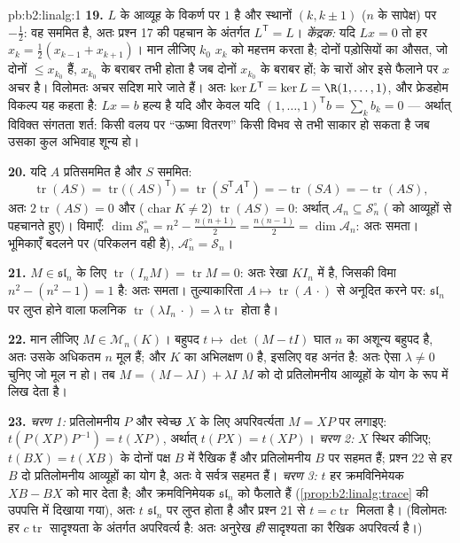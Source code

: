 \begin{solution}{pb:b2:linalg:1}
\textbf{19.} $L$ के आव्यूह के विकर्ण पर $1$ है और स्थानों $(k, k\pm1)$ ($n$ के
सापेक्ष) पर $-\frac12$: वह सममित है, अतः प्रश्न 17 की पहचान के अंतर्गत $L^{\mathsf T} = L$।
\emph{केंद्रक:} यदि $Lx = 0$ तो हर $x_k = \frac12(x_{k-1} +
x_{k+1})$। मान लीजिए $k_0$ $x_k$ को महत्तम करता
है; दोनों पड़ोसियों का औसत, जो दोनों $\leq x_{k_0}$ हैं, $x_{k_0}$ के बराबर तभी होता
है जब दोनों $x_{k_0}$ के बराबर हों;  के चारों ओर इसे फैलाने पर $x$
अचर है। विलोमतः अचर सदिश मारे जाते हैं। अतः $\ker L^{\mathsf T} = \ker L
= \R(1, \dots, 1)$, और फ्रेडहोम विकल्प
यह कहता है: $Lx = b$ हल्य है यदि और केवल यदि $(1,\dots,1)^{\mathsf T} b = \sum_k b_k = 0$ --- अर्थात् विविक्त
संगतता शर्त: किसी वलय पर ``ऊष्मा वितरण'' किसी विभव से तभी साकार हो
सकता है जब उसका कुल अभिवाह शून्य हो।

\textbf{20.} यदि $A$ प्रतिसममित है और $S$ सममित:
\[
\operatorname{tr}(AS) = \operatorname{tr}\bigl((AS)^{\mathsf
T}\bigr) = \operatorname{tr}(S^{\mathsf T}A^{\mathsf T}) =
-\operatorname{tr}(SA) = -\operatorname{tr}(AS),
\]
अतः $2\operatorname{tr}(AS) = 0$ और ($\operatorname{char} K \neq
2$) $\operatorname{tr}(AS) = 0$: अर्थात् $\mathcal{A}_n \subseteq
\mathcal{S}_n^\circ$ ( को आव्यूहों से पहचानते
हुए)। विमाएँ: $\dim\mathcal{S}_n^\circ = n^2 - \frac{n(n+1)}2 =
\frac{n(n-1)}2 = \dim\mathcal{A}_n$: अतः समता। भूमिकाएँ बदलने पर (परिकलन वही है), $\mathcal{A}_n^\circ = \mathcal{S}_n$।

\textbf{21.} $M \in \mathfrak{sl}_n$ के लिए $\operatorname{tr}(I_nM) = \operatorname{tr} M = 0$: अतः रेखा $KI_n$  में है, जिसकी विमा
$n^2 - (n^2 - 1) = 1$ है: अतः समता। तुल्याकारिता $A \mapsto
\operatorname{tr}(A\,\cdot)$ से अनूदित करने पर: $\mathfrak{sl}_n$ पर लुप्त
होने वाला फलनिक $\operatorname{tr}(\lambda I_n\,\cdot) =
\lambda\operatorname{tr}$ होता है।

\textbf{22.} मान लीजिए $M \in \mathcal{M}_n(K)$। बहुपद $t
\mapsto \det(M - tI)$ घात $n$ का अशून्य बहुपद है, अतः
उसके अधिकतम $n$ मूल हैं; और $K$ का अभिलक्षण $0$ है, इसलिए वह अनंत है:
अतः ऐसा $\lambda \neq 0$ चुनिए जो मूल न हो। तब $M = (M - \lambda I) +
\lambda I$ $M$ को दो प्रतिलोमनीय आव्यूहों
के योग के रूप में लिख देता है।

\textbf{23.} \emph{चरण 1:} प्रतिलोमनीय $P$ और स्वेच्छ $X$ के लिए
अपरिवर्त्यता $M = XP$ पर लगाइए: $t(P(XP)P^{-1}) = t(XP)$, अर्थात् $t(PX) = t(XP)$। \emph{चरण 2:} $X$ स्थिर
कीजिए; $t(BX) = t(XB)$ के दोनों पक्ष $B$ में रैखिक हैं और प्रतिलोमनीय $B$ पर सहमत
हैं; प्रश्न 22 से हर $B$ दो प्रतिलोमनीय आव्यूहों का योग है, अतः वे
सर्वत्र सहमत हैं। \emph{चरण 3:} $t$ हर क्रमविनिमेयक $XB
- BX$ को मार देता
है; और क्रमविनिमेयक $\mathfrak{sl}_n$ को फैलाते हैं (\cref{prop:b2:linalg:trace} की उपपत्ति में दिखाया
गया), अतः $t$ $\mathfrak{sl}_n$ पर लुप्त होता है और प्रश्न 21 से $t =
c\operatorname{tr}$ मिलता है।
(विलोमतः हर $c\operatorname{tr}$ सादृश्यता के अंतर्गत अपरिवर्त्य है: अतः अनुरेख
\emph{ही} सादृश्यता का रैखिक अपरिवर्त्य है।)


\end{solution}
